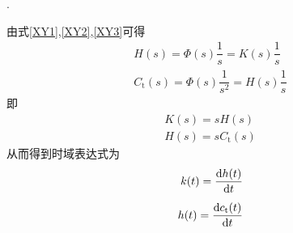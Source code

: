 . 
\par 由式\eqref{XY1},\eqref{XY2},\eqref{XY3}可得
\begin{align}
	H(s) = \varPhi(s) \dfrac{1}{s} =K(s) \dfrac{1}{s} \\[0.5em]
	C_\text{t}(s) = \varPhi(s) \dfrac{1}{s^2} = H(s)\dfrac{1}{s}
\end{align}
即
\begin{align}
	K(s)=sH(s)\\[0.5em]
	H(s) = sC_\text{t} (s)
\end{align}
从而得到时域表达式为
\begin{align}
	k(t) = \dfrac{{\rm{d}} h(t)}{{\rm{d}} t}\\[0.5em]
	h(t) = \dfrac{{\rm{d}} c_{\text{t}}(t)}{{\rm{d}} t}
\end{align}

